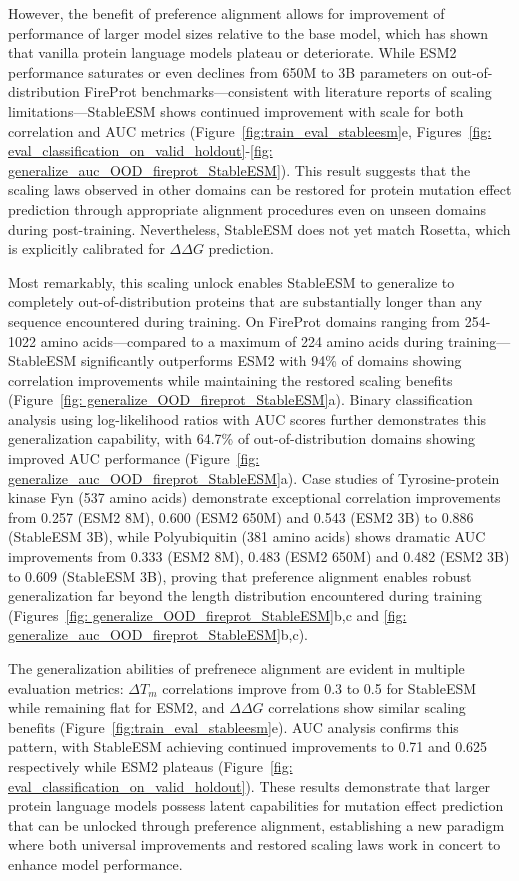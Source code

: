 \documentclass[]{fairmeta}
\begin{document}
However, the benefit of preference alignment allows for improvement of performance of larger model sizes relative to the base model, which has shown that vanilla protein language models plateau or deteriorate. While ESM2 performance saturates or even declines from 650M to 3B parameters on out-of-distribution FireProt benchmarks—consistent with literature reports of scaling limitations—StableESM shows continued improvement with scale for both correlation and AUC metrics (Figure~\ref{fig:train_eval_stableesm}e, Figures~\ref{fig: eval_classification_on_valid_holdout}-\ref{fig: generalize_auc_OOD_fireprot_StableESM}). This result suggests that the scaling laws observed in other domains can be restored for protein mutation effect prediction through appropriate alignment procedures even on unseen domains during post-training. Nevertheless, StableESM does not yet match Rosetta, which is explicitly calibrated for $\Delta \Delta G$ prediction.

Most remarkably, this scaling unlock enables StableESM to generalize to completely out-of-distribution proteins that are substantially longer than any sequence encountered during training. On FireProt domains ranging from 254-1022 amino acids—compared to a maximum of 224 amino acids during training—StableESM significantly outperforms ESM2 with 94\% of domains showing correlation improvements while maintaining the restored scaling benefits (Figure~\ref{fig: generalize_OOD_fireprot_StableESM}a). Binary classification analysis using log-likelihood ratios with AUC scores further demonstrates this generalization capability, with 64.7\% of out-of-distribution domains showing improved AUC performance (Figure~\ref{fig: generalize_auc_OOD_fireprot_StableESM}a). Case studies of Tyrosine-protein kinase Fyn (537 amino acids) demonstrate exceptional correlation improvements from 0.257 (ESM2 8M), 0.600 (ESM2 650M) and 0.543 (ESM2 3B) to 0.886 (StableESM 3B), while Polyubiquitin (381 amino acids) shows dramatic AUC improvements from 0.333 (ESM2 8M), 0.483 (ESM2 650M) and 0.482 (ESM2 3B) to 0.609 (StableESM 3B), proving that preference alignment enables robust generalization far beyond the length distribution encountered during training (Figures~\ref{fig: generalize_OOD_fireprot_StableESM}b,c and \ref{fig: generalize_auc_OOD_fireprot_StableESM}b,c).

The generalization abilities of prefrenece alignment are evident in multiple evaluation metrics: $\Delta T_m$ correlations improve from 0.3 to 0.5 for StableESM while remaining flat for ESM2, and $\Delta\Delta G$ correlations show similar scaling benefits (Figure~\ref{fig:train_eval_stableesm}e). AUC analysis confirms this pattern, with StableESM achieving continued improvements to 0.71 and 0.625 respectively while ESM2 plateaus (Figure~\ref{fig: eval_classification_on_valid_holdout}). These results demonstrate that larger protein language models possess latent capabilities for mutation effect prediction that can be unlocked through preference alignment, establishing a new paradigm where both universal improvements and restored scaling laws work in concert to enhance model performance.
\end{document}
